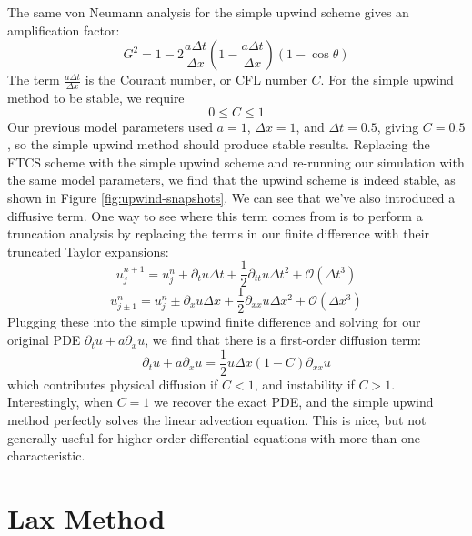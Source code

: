 \documentclass[%
 reprint,
 amsmath,amssymb,
 aps,
]{revtex4-2}
\begin{document}
The same von Neumann analysis for the simple upwind scheme gives an amplification factor:
\begin{equation}
G ^2 = 1 - 2 \frac{a \Delta t}{\Delta x} \left(1 - \frac{a \Delta t}{\Delta x} \right)(1 - \cos \theta)
\end{equation}
The term $\frac{a \Delta t}{\Delta x}$ is the Courant number, or CFL number $C$. For the simple upwind method to be stable, we require
\begin{equation}
0 \leq C \leq 1
\end{equation}
Our previous model parameters used $a = 1$, $\Delta x = 1$, and $\Delta t = 0.5$, giving $C = 0.5$, so the simple upwind method should produce stable results. Replacing the FTCS scheme with the simple upwind scheme and re-running our simulation with the same model parameters, we find that the upwind scheme is indeed stable, as shown in Figure \ref{fig:upwind-snapshots}.
We can see that we've also introduced a diffusive term. One way to see where this term comes from is to perform a truncation analysis by replacing the terms in our finite difference with their truncated Taylor expansions:
\begin{equation}
u_j ^{n+1} = u_j ^n + \partial _t u \Delta t + \frac{1}{2} \partial_{tt} u \Delta t^2 + \mathcal{O}(\Delta t^3)
\end{equation}
\begin{equation}
u_{j \pm 1} ^n = u_j ^n \pm \partial _x u \Delta x + \frac{1}{2} \partial_{xx} u \Delta x^2 + \mathcal{O}(\Delta x^3)
\end{equation}
Plugging these into the simple upwind finite difference and solving for our original PDE $\partial _t u + a \partial_x u$, we find that there is a first-order diffusion term:
\begin{equation}
\partial_t u + a \partial_x u = \frac{1}{2} u \Delta x (1 - C) \partial_{xx} u
\end{equation}
which contributes physical diffusion if $C < 1$, and instability if $C > 1$. Interestingly, when $C = 1$ we recover the exact PDE, and the simple upwind method perfectly solves the linear advection equation. This is nice, but not generally useful for higher-order differential equations with more than one characteristic.

\section{Lax Method}
\end{document}

